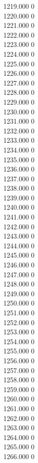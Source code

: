 { 1219.000	0 \\
 1220.000	0 \\
 1221.000	0 \\
 1222.000	0 \\
 1223.000	0 \\
 1224.000	0 \\
 1225.000	0 \\
 1226.000	0 \\
 1227.000	0 \\
 1228.000	0 \\
 1229.000	0 \\
 1230.000	0 \\
 1231.000	0 \\
 1232.000	0 \\
 1233.000	0 \\
 1234.000	0 \\
 1235.000	0 \\
 1236.000	0 \\
 1237.000	0 \\
 1238.000	0 \\
 1239.000	0 \\
 1240.000	0 \\
 1241.000	0 \\
 1242.000	0 \\
 1243.000	0 \\
 1244.000	0 \\
 1245.000	0 \\
 1246.000	0 \\
 1247.000	0 \\
 1248.000	0 \\
 1249.000	0 \\
 1250.000	0 \\
 1251.000	0 \\
 1252.000	0 \\
 1253.000	0 \\
 1254.000	0 \\
 1255.000	0 \\
 1256.000	0 \\
 1257.000	0 \\
 1258.000	0 \\
 1259.000	0 \\
 1260.000	0 \\
 1261.000	0 \\
 1262.000	0 \\
 1263.000	0 \\
 1264.000	0 \\
 1265.000	0 \\
 1266.000	0 \\
}
